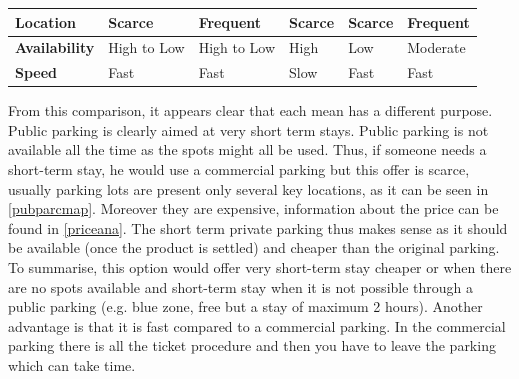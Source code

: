 \documentclass[12pt,a4paper,oneside]{book}
\newcommand\T{\rule{0pt}{2.6ex}}       %
\newcommand\B{\rule[-1.2ex]{0pt}{0pt}} %
\begin{document}
\begin{table}[h]
\begin{adjustbox}{center}
\begin{tabular}{l|l|l|l|l|l|}
\multicolumn{1}{|l|}{\textbf{Location}\T\B}     & Scarce                             & Frequent                                                     & Scarce                                                                                                      & Scarce                                                                                                             & Frequent                                                                                                            \\ \hline
\multicolumn{1}{|l|}{\textbf{Availability}\T\B} & High to Low                        & High to Low                                                  & High                                                                                                        & Low                                                                                                                & Moderate                                                                                                            \\ \hline
\multicolumn{1}{|l|}{\textbf{Speed}\T\B}        & Fast                               & Fast                                                         & Slow                                                                                                        & Fast                                                                                                               & Fast                                                                                                                \\ \hline
\end{tabular}
\end{adjustbox}
\end{table}

From this comparison, it appears clear that each mean has a different purpose. Public parking is clearly aimed at very short term stays. Public parking is not available all the time as the spots might all be used. Thus, if someone needs a short-term stay, he would use a commercial parking but this offer is scarce, usually parking lots are present only several key locations, as it can be seen in \autoref{pubparcmap}. Moreover they are expensive, information about the price can be found in \autoref{priceana}. The short term private parking thus makes sense as it should be available (once the product is settled) and cheaper than the original parking. To summarise, this option would offer very short-term stay cheaper or when there are no spots available and short-term stay when it is not possible through a public parking (e.g. blue zone, free but a stay of maximum 2 hours). Another advantage is that it is fast compared to a commercial parking. In the commercial parking there is all the ticket procedure and then you have to leave the parking which can take time.\\
\end{document}
